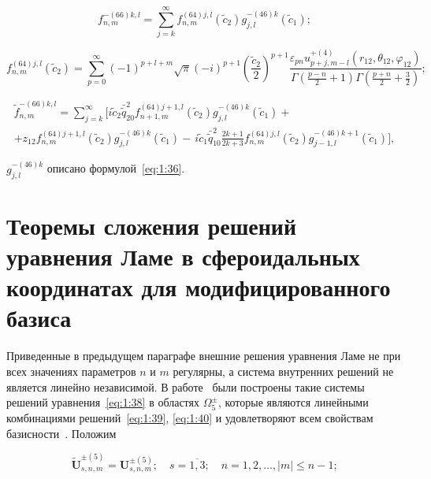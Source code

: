 \begin{theorem}
\begin{equation}\label{eq:1:86}
f_{n,m}^{ - (66)k,l} = \sum\limits_{j = k}^\infty  {f_{n,m}^{(64)j,l}({{\tilde c}_2})g_{j,l}^{ - (46)k}} ({\tilde c_1});
\end{equation}

\begin{equation}\label{eq:1:87}
f_{n,m}^{(64)j,l}({\tilde c_2}) = \sum\limits_{p = 0}^\infty  {{{( - 1)}^{p + l + m}}} \sqrt \pi  {( - i)^{p + 1}}{\left( {\frac{{{{\tilde c}_2}}}{2}} \right)^{p + 1}}\frac{{{\varepsilon _{pn}}u_{p + j,m - l}^{ + (4)}\left( {{r_{12}},{\theta _{12}},{\varphi _{12}}} \right)}}{{\Gamma \left( {\frac{{p - n}}{2} + 1} \right)\Gamma \left( {\frac{{p + n}}{2} + \frac{3}{2}} \right)}};
\end{equation}

\begin{multline}\label{eq:1:88}
\tilde f_{n,m}^{ - (66)k,l} = \sum\limits_{j = k}^\infty\bigg[i{{\tilde c}_2}\bar{\tilde q}_{20}^2f_{n + 1,m}^{(64)j + 1,l}({{\tilde c}_2})g_{j,l}^{ - (46)k}({{\tilde c}_1}) + \\
+ {z_{12}}f_{n,m}^{(64)j + 1,l}({{\tilde c}_2})g_{j,l}^{ - (46)k}({{\tilde c}_1}) - {\frac{{}}{{}}i{{\tilde c}_1}\bar{\tilde q}_{10}^2\frac{{2k + 1}}{{2k + 3}}f_{n,m}^{(64)j,l}({{\tilde c}_2})g_{j - 1,l}^{ - (46)k + 1}({{\tilde c}_1})} \bigg],
\end{multline}

\noindent $g_{j,l}^{ - (46)k}$ описано формулой~\eqref{eq:1:36}.
\end{theorem}

\section{Теоремы сложения решений уравнения Ламе в сфероидальных координатах для модифицированного базиса}

Приведенные в предыдущем параграфе внешние решения уравнения Ламе не при всех значениях параметров $n$ и $m$ регулярны, а система внутренних решений не является линейно независимой. В работе~\cite{Nikolaev1993} были построены такие системы решений уравнения~\eqref{eq:1:38} в областях $\Omega_5^{\pm}$, которые являются линейными комбинациями решений~\eqref{eq:1:39}, \eqref{eq:1:40} и удовлетворяют всем свойствам базисности~\cite{Nikolaev1998}. Положим

\begin{equation}\label{eq:1:89a}
\mathbf{\tilde U}_{s,n,m}^{\pm(5)}=\mathbf{U}_{s,n,m}^{\pm(5)};\quad s=\overline{1,3};\quad n=1,2,\dots, |m|\le n-1;
\end{equation}

